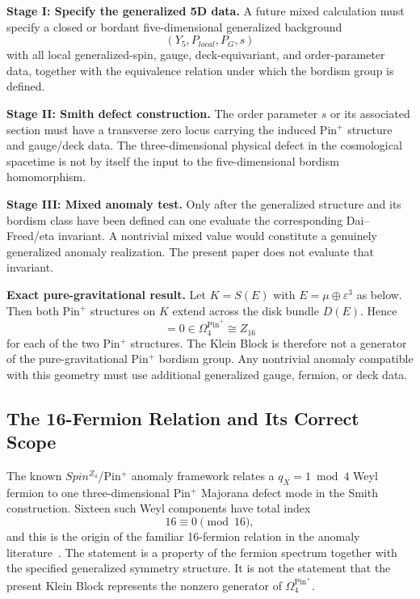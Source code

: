 \documentclass[11pt]{article}
\theoremstyle{canonmath}
\theoremstyle{canonpostulate}
\theoremstyle{canonclaim}
\providecommand{\Klein}{\mathcal{K}}
\providecommand{\Pin}{\operatorname{Pin}}
\def\mathrm#1{#1}%
\def\mathbb#1{#1}%
\def\mathcal#1{#1}%
\begin{document}
\textbf{Stage I: Specify the generalized 5D data.} A future mixed calculation must specify a closed or bordant five-dimensional generalized background
\begin{equation}
(Y_5,P_{\mathrm{local}},P_G,s)
\end{equation}
with all local generalized-spin, gauge, deck-equivariant, and order-parameter data, together with the equivalence relation under which the bordism group is defined.

\textbf{Stage II: Smith defect construction.} The order parameter $s$ or its associated section must have a transverse zero locus carrying the induced Pin$^+$ structure and gauge/deck data. The three-dimensional physical defect in the cosmological spacetime is not by itself the input to the five-dimensional bordism homomorphism.

\textbf{Stage III: Mixed anomaly test.} Only after the generalized structure and its bordism class have been defined can one evaluate the corresponding Dai--Freed/eta invariant. A nontrivial mixed value would constitute a genuinely generalized anomaly realization. The present paper does not evaluate that invariant.

\begin{keyresult}
\textbf{Exact pure-gravitational result.} Let $\Klein=S(E)$ with $E=\mu\oplus\varepsilon^3$ as below. Then both Pin$^+$ structures on $\Klein$ extend across the disk bundle $D(E)$. Hence
\begin{equation}
[\Klein,P_{\Pin^+}]=0\in\Omega_4^{\Pin^+}\cong\mathbb Z_{16}
\end{equation}
for each of the two Pin$^+$ structures. The Klein Block is therefore not a generator of the pure-gravitational Pin$^+$ bordism group. Any nontrivial anomaly compatible with this geometry must use additional generalized gauge, fermion, or deck data.
\end{keyresult}

\subsection{The 16-Fermion Relation and Its Correct Scope}

The known $\mathrm{Spin}^{\mathbb Z_4}$/Pin$^+$ anomaly framework relates a $q_X=1\bmod4$ Weyl fermion to one three-dimensional Pin$^+$ Majorana defect mode in the Smith construction. Sixteen such Weyl components have total index
\begin{equation}
16\equiv0\pmod{16},
\end{equation}
and this is the origin of the familiar 16-fermion relation in the anomaly literature~\cite{GarciaEtxebarria}. The statement is a property of the fermion spectrum together with the specified generalized symmetry structure. It is not the statement that the present Klein Block represents the nonzero generator of $\Omega_4^{\Pin^+}$.
\end{document}
